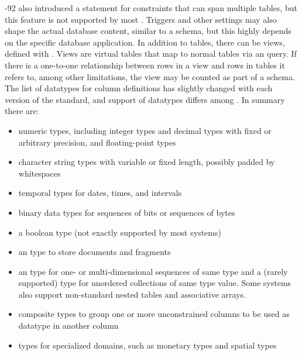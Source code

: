 -92 also introduced a  statement for
constraints that can span multiple tables, but this feature is not supported by
most . Triggers and other settings may also shape the actual
database content, similar to a schema, but this highly depends on the specific
database application. In addition to tables, there can be views, defined with
. Views are virtual tables that map to normal tables via an
 query.  If there is a one-to-one relationship between rows in a view
and rows in tables it refers to, among other limitations, the view may be
counted as part of a schema.  The list of  datatypes for column
definitions has slightly changed with each version of the standard, and support
of datatypes differs among . In summary there are:


\begin{itemize}
\item numeric types, including integer types and decimal types with fixed or arbitrary precision, 
  and floating-point types
\item character string types with variable or fixed length, possibly padded by whitespaces
\item temporal types for dates, times, and intervals
\item binary data types for sequences of bits or sequences of bytes
\item a boolean type (not exactly supported by most systems)
\item an  type to store  documents and fragments
\item an  type for one- or multi-dimensional sequences of same type and a 
  (rarely supported)  type for unordered collections of same type value. Some 
  systems also support non-standard nested tables and associative arrays.
\item composite types to group one or more unconstrained columns to be used as datatype
  in another column
\item types for specialized domains, such as monetary types and spatial types
\end{itemize}


